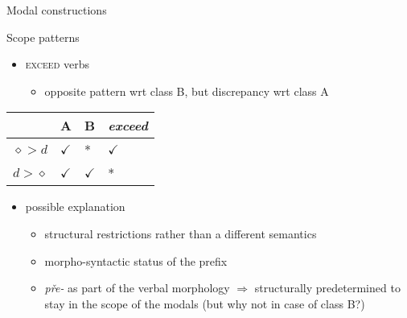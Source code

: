 \documentclass[12pt]{beamer}
\begin{document}
\begin{frame}{Modal constructions}

Scope patterns

\begin{itemize}
\item \textsc{exceed} verbs
\begin{itemize}
\item opposite pattern wrt class B, but discrepancy wrt class A
\end{itemize}
\end{itemize}

\begin{table}[]
\centering
\label{table-scope-a-b-exceed}
\begin{tabular}{@{}llll@{}}
\toprule
                          & A      & B      & \textit{exceed}  \\ \midrule
$\diamond > d$ & $\checkmark$ & *      & $\checkmark$ \\
$d > \diamond$ & $\checkmark$ & $\checkmark$ & *      \\ \bottomrule
\end{tabular}
\end{table}

\begin{itemize}
\item possible explanation
\begin{itemize}
\item structural restrictions rather than a different semantics
\item morpho-syntactic status of the prefix
\item \textit{pře-} as part of the verbal morphology $\Rightarrow$ structurally predetermined to stay in the scope of the modals (but why not in case of class B?)
\end{itemize}

\end{itemize}



\end{frame}
		
\end{document}
